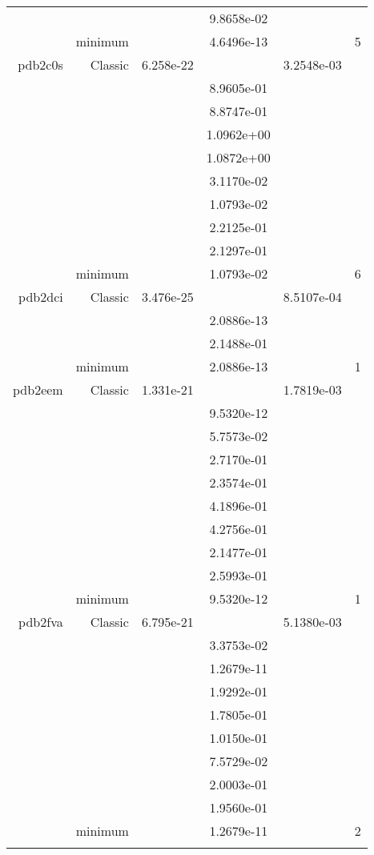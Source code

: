 \begin{xltabular}{\textwidth}{r|rS[table-format=1.3e+2]S[table-format=1.4e+2]S[table-format=1.4e+2]S[table-format=-1.5]}
&  &  & 9.8658e-02 & & \\
& minimum &  & 4.6496e-13 & & 5 \\  \addlinespace
pdb2c0s & Classic & 6.258e-22 &  & 3.2548e-03 & \\
&  &  & 8.9605e-01 & & \\
&  &  & 8.8747e-01 & & \\
&  &  & 1.0962e+00 & & \\
&  &  & 1.0872e+00 & & \\
&  &  & 3.1170e-02 & & \\
&  &  & 1.0793e-02 & & \\
&  &  & 2.2125e-01 & & \\
&  &  & 2.1297e-01 & & \\
& minimum &  & 1.0793e-02 & & 6 \\  \addlinespace
pdb2dci & Classic & 3.476e-25 &  & 8.5107e-04 & \\
&  &  & 2.0886e-13 & & \\
&  &  & 2.1488e-01 & & \\
& minimum &  & 2.0886e-13 & & 1 \\  \addlinespace
pdb2eem & Classic & 1.331e-21 &  & 1.7819e-03 & \\
&  &  & 9.5320e-12 & & \\
&  &  & 5.7573e-02 & & \\
&  &  & 2.7170e-01 & & \\
&  &  & 2.3574e-01 & & \\
&  &  & 4.1896e-01 & & \\
&  &  & 4.2756e-01 & & \\
&  &  & 2.1477e-01 & & \\
&  &  & 2.5993e-01 & & \\
& minimum &  & 9.5320e-12 & & 1 \\  \addlinespace
pdb2fva & Classic & 6.795e-21 &  & 5.1380e-03 & \\
&  &  & 3.3753e-02 & & \\
&  &  & 1.2679e-11 & & \\
&  &  & 1.9292e-01 & & \\
&  &  & 1.7805e-01 & & \\
&  &  & 1.0150e-01 & & \\
&  &  & 7.5729e-02 & & \\
&  &  & 2.0003e-01 & & \\
&  &  & 1.9560e-01 & & \\
& minimum &  & 1.2679e-11 & & 2 \\  \addlinespace

\end{xltabular}
